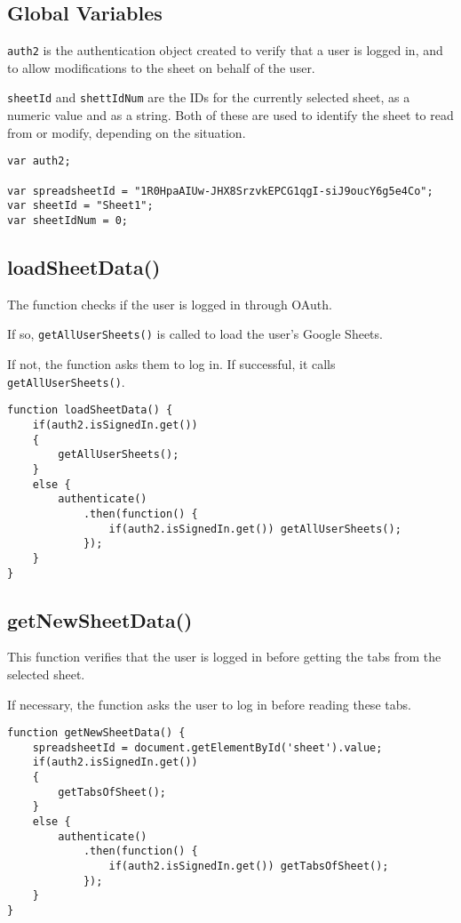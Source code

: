 \documentclass[letterpaper]{article}
\begin{document}
\subsection{Global Variables}

\lstinline{auth2} is the authentication object created to verify that a user is logged in, and to allow modifications to the sheet on behalf of the user.

\lstinline{sheetId} and \lstinline{shettIdNum} are the IDs for the currently selected sheet, as a numeric value and as a string.
Both of these are used to identify the sheet to read from or modify, depending on the situation.

\begin{lstlisting}[firstnumber=1]
var auth2;

var spreadsheetId = "1R0HpaAIUw-JHX8SrzvkEPCG1qgI-siJ9oucY6g5e4Co";
var sheetId = "Sheet1";
var sheetIdNum = 0;
\end{lstlisting}

\subsection{loadSheetData()}

The function checks if the user is logged in through OAuth.

If so, \lstinline{getAllUserSheets()} is called to load the user's Google Sheets.

If not, the function asks them to log in.
If successful, it calls \lstinline{getAllUserSheets()}.

\begin{lstlisting}[firstnumber=7]
function loadSheetData() {
    if(auth2.isSignedIn.get())
    {
        getAllUserSheets();
    }
    else {
        authenticate()
            .then(function() {
                if(auth2.isSignedIn.get()) getAllUserSheets();
            });
    }
}
\end{lstlisting}

\subsection{getNewSheetData()}

This function verifies that the user is logged in before getting the tabs from the selected sheet.

If necessary, the function asks the user to log in before reading these tabs.

\begin{lstlisting}[firstnumber=20]
function getNewSheetData() {
    spreadsheetId = document.getElementById('sheet').value;
    if(auth2.isSignedIn.get())
    {
        getTabsOfSheet();
    }
    else {
        authenticate()
            .then(function() {
                if(auth2.isSignedIn.get()) getTabsOfSheet();
            });
    }
}
\end{lstlisting}
\end{document}
